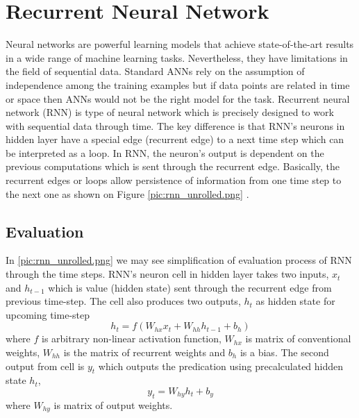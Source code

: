 \chapter{Recurrent Neural Network}

Neural networks are powerful learning models that achieve state-of-the-art results in a wide range of machine learning tasks.
Nevertheless, they have limitations in the field of sequential data.
Standard ANNs rely on the assumption of independence among the training examples but if data points are related in time or space then ANNs would not be the right model for the task\cite{critical_rnn}.
\newline
Recurrent neural network (RNN) is type of neural network which is precisely designed to work with sequential data through time.
The key difference is that RNN's neurons in hidden layer have a special edge (recurrent edge) to a next time step which can be interpreted as a loop.
In RNN, the neuron's output is dependent on the previous computations which is sent through the recurrent edge.
Basically, the recurrent edges or loops allow persistence of information from one time step to the next one as shown on Figure \ref{pic:rnn_unrolled.png} \cite{rnn_generation}.


\section{Evaluation}

In \ref{pic:rnn_unrolled.png} we may see simplification of evaluation process of RNN through the time steps.
RNN's neuron cell in hidden layer takes two inputs, $x_t$ and $h_{t-1}$ which is value (hidden state) sent through the recurrent edge from previous time-step.
The cell also produces two outputs, $h_t$ as hidden state for upcoming time-step
\[ h_t = f(W_{hx}x_t + W_{hh}h_{t-1} + b_h) \]
where $f$ is arbitrary non-linear activation function, $W_{hx}$ is matrix of conventional weights, $W_{hh}$ is the matrix of recurrent weights and $b_h$ is a bias.
The second output from cell is $y_t$ which outputs the predication using precalculated hidden state $h_t$,
\[ y_t = W_{hy}h_t + b_y \]
where $W_{hy}$ is matrix of output weights.

